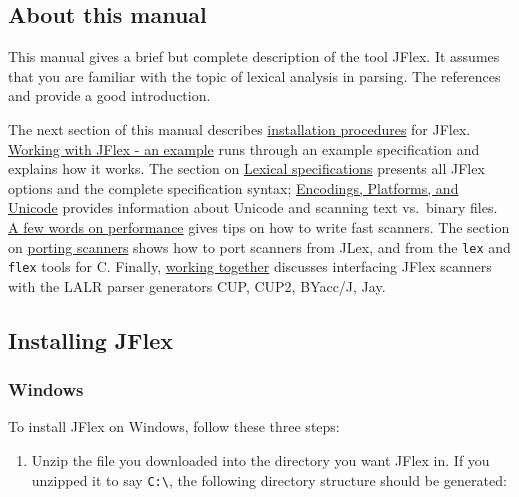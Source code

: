 \subsection{About this manual}\label{about-this-manual}

This manual gives a brief but complete description of the tool JFlex. It
assumes that you are familiar with the topic of lexical analysis in
parsing. The references \textcite{Aho_SU_86} and \textcite{Appel_98}
provide a good introduction.

The next section of this manual describes
\hyperref[Installing]{installation procedures} for JFlex.
\hyperref[Example]{Working with JFlex - an example} runs through an
example specification and explains how it works. The section on
\hyperref[Specifications]{Lexical specifications} presents all JFlex
options and the complete specification syntax;
\hyperref[sec:encodings]{Encodings, Platforms, and Unicode} provides
information about Unicode and scanning text vs.~binary files.
\hyperref[performance]{A few words on performance} gives tips on how to
write fast scanners. The section on \hyperref[Porting]{porting scanners}
shows how to port scanners from JLex, and from the \texttt{lex} and
\texttt{flex} tools for C. Finally, \hyperref[WorkingTog]{working
together} discusses interfacing JFlex scanners with the LALR parser
generators CUP, CUP2, BYacc/J, Jay.


\subsection{Installing JFlex}\label{installing-jflex}

\subsubsection{Windows}\label{windows}

To install JFlex on Windows, follow these three steps:

\begin{enumerate}
\def\labelenumi{\arabic{enumi}.}
\itemsep1pt\parskip0pt
\item
  Unzip the file you downloaded into the directory you want JFlex in. If
  you unzipped it to say \texttt{C:\textbackslash{}}, the following
  directory structure should be generated:
\end{enumerate}

